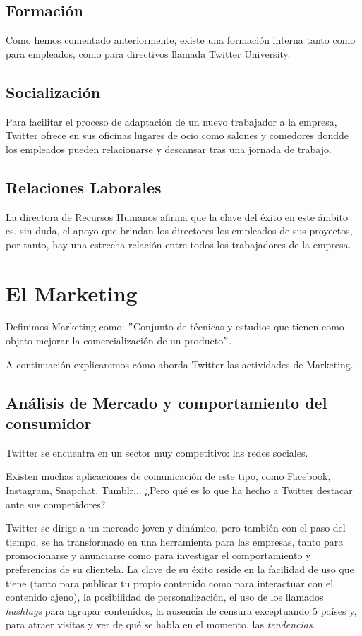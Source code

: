 \subsection{Formación}

Como hemos comentado anteriormente, existe una formación interna tanto como para empleados, como para directivos llamada Twitter University.

\subsection{Socialización}

Para facilitar el proceso de adaptación de un nuevo trabajador a la empresa, Twitter ofrece en sus oficinas lugares de ocio como salones y comedores dondde los empleados pueden relacionarse y descansar tras una jornada de trabajo.

\subsection{Relaciones Laborales}

La directora de Recursos Humanos afirma que la clave del éxito en este ámbito es, sin duda, el apoyo que brindan los directores los empleados de sus proyectos, por tanto, hay una estrecha relación entre todos los trabajadores de la empresa.

\section{El Marketing}

Definimos Marketing como: $"$Conjunto de técnicas y estudios que tienen como objeto mejorar la comercialización de un producto$"$.

A continuación explicaremos cómo aborda Twitter las actividades de Marketing.

\subsection{Análisis de Mercado y comportamiento del consumidor}

Twitter se encuentra en un sector muy competitivo: las redes sociales.

Existen muchas aplicaciones de comunicación de este tipo, como Facebook, Instagram, Snapchat, Tumblr... ¿Pero qué es lo que ha hecho a Twitter destacar ante sus competidores?

Twitter se dirige a un mercado joven y dinámico, pero también con el paso del tiempo, se ha transformado en una herramienta para las empresas, tanto para promocionarse y anunciarse como para investigar el comportamiento y preferencias de su clientela.
La clave de su éxito reside en la facilidad de uso que tiene (tanto para publicar tu propio contenido como para interactuar con el contenido ajeno), la posibilidad de personalización, el uso de los llamados \textit{hashtags} para agrupar contenidos, la ausencia de censura exceptuando 5 países y, para atraer visitas y ver de qué se habla en el momento, las \textit{tendencias}.

